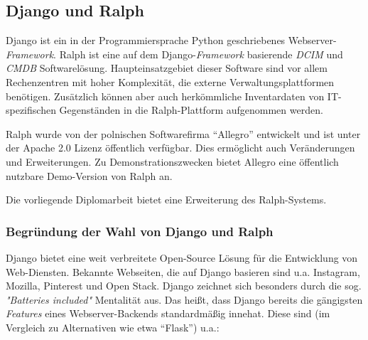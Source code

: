 \hypertarget{django-und-ralph}{%
\subsection{Django und Ralph}\label{django-und-ralph}}

Django ist ein in der Programmiersprache Python geschriebenes
Webserver-\emph{Framework}.
Ralph ist eine auf dem
Django-\emph{Framework}
basierende
\emph{DCIM}
und
\emph{CMDB}
Softwarelösung. Haupteinsatzgebiet dieser Software sind vor allem
Rechenzentren mit hoher Komplexität, die externe Verwaltungsplattformen
benötigen. Zusätzlich können aber auch herkömmliche Inventardaten von
IT-spezifischen Gegenständen in die Ralph-Plattform aufgenommen werden.

Ralph wurde von der polnischen Softwarefirma ``Allegro'' entwickelt und
ist unter der Apache 2.0 Lizenz öffentlich verfügbar. Dies ermöglicht
auch Veränderungen und Erweiterungen. Zu Demonstrationszwecken bietet
Allegro eine öffentlich nutzbare Demo-Version \cite{ralph-demo} von
Ralph an.

Die vorliegende Diplomarbeit bietet eine Erweiterung des Ralph-Systems.

\hypertarget{begruxfcndung-der-wahl-von-django-und-ralph}{%
\subsubsection{Begründung der Wahl von Django und
Ralph}\label{begruxfcndung-der-wahl-von-django-und-ralph}}

Django bietet eine weit verbreitete Open-Source Lösung für die
Entwicklung von Web-Diensten. Bekannte Webseiten, die auf Django
basieren sind u.a. Instagram, Mozilla, Pinterest und Open Stack.
\cite{django-overview} Django zeichnet sich besonders durch die sog.
\emph{"Batteries included"}
Mentalität aus. Das heißt, dass Django bereits die gängigsten
\emph{Features}
eines Webserver-Backends standardmäßig innehat. Diese sind (im Vergleich
zu Alternativen wie etwa ``Flask'') u.a.:

